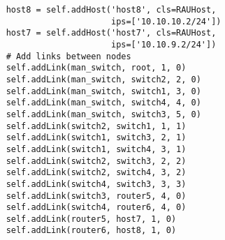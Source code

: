 \begin{verbatim}
    host8 = self.addHost('host8', cls=RAUHost,
                         ips=['10.10.10.2/24'])
    host7 = self.addHost('host7', cls=RAUHost,
                         ips=['10.10.9.2/24'])
    # Add links between nodes
    self.addLink(man_switch, root, 1, 0)
    self.addLink(man_switch, switch2, 2, 0)
    self.addLink(man_switch, switch1, 3, 0)
    self.addLink(man_switch, switch4, 4, 0)
    self.addLink(man_switch, switch3, 5, 0)
    self.addLink(switch2, switch1, 1, 1)
    self.addLink(switch1, switch3, 2, 1)
    self.addLink(switch1, switch4, 3, 1)
    self.addLink(switch2, switch3, 2, 2)
    self.addLink(switch2, switch4, 3, 2)
    self.addLink(switch4, switch3, 3, 3)
    self.addLink(switch3, router5, 4, 0)
    self.addLink(switch4, router6, 4, 0)
    self.addLink(router5, host7, 1, 0)
    self.addLink(router6, host8, 1, 0)
\end{verbatim}



